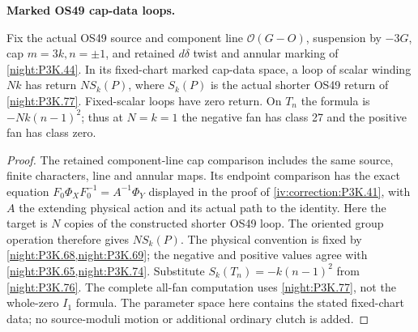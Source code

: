 \begin{proposition}\label{iv:correction:P3K.44}
\textbf{Marked OS49 cap-data loops.}\par
Fix the actual OS49 source and component line
\(\mathcal O(G-O)\), suspension by \(-3G\), cap
\(m=3k,n=\pm1\), and retained \(d\delta\) twist and
annular marking of \cref{night:P3K.44}. In its fixed-chart
marked cap-data space, a loop of scalar winding \(Nk\)
has return \(N S_k(P)\), where \(S_k(P)\) is the actual
shorter OS49 return of \cref{night:P3K.77}. Fixed-scalar
loops have zero return. On \(T_n\) the formula is
\(-Nk(n-1)^2\); thus at \(N=k=1\) the negative fan has
class 27 and the positive fan has class zero.
\end{proposition}
\begin{proof}
The retained component-line cap comparison includes
the same source, finite characters, line and annular maps.
Its endpoint comparison has the exact equation
\(F_0\Phi_XF_0^{-1}=A^{-1}\Phi_Y\) displayed in the proof of
\cref{iv:correction:P3K.41}, with \(A\) the extending
physical action and its actual path to the identity. Here
the target is \(N\) copies of the constructed shorter OS49
loop. The oriented group operation therefore gives
\(N S_k(P)\). The physical convention is fixed by
\cref{night:P3K.68,night:P3K.69}; the negative and positive
values agree with \cref{night:P3K.65,night:P3K.74}.
Substitute \(S_k(T_n)=-k(n-1)^2\) from
\cref{night:P3K.76}. The complete all-fan computation uses
\cref{night:P3K.77}, not the whole-zero \(I_1\) formula.
The parameter space here contains the stated fixed-chart data;
no source-moduli motion or additional ordinary clutch is added.
\end{proof}


